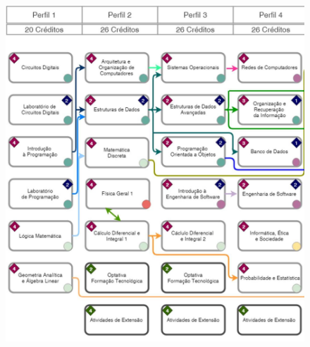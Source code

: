 \begin{figure}[h]
    \centering
    \includegraphics[width=\textwidth]{./imagem/grade.jpeg}
\end{figure}
